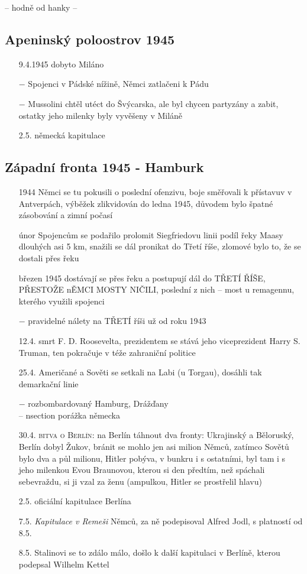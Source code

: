 \documentclass{article}
\begin{document}
-- hodně od hanky --

\subsection*{Apeninský poloostrov 1945}
\begin{itemize}
    \vspace{-0.5em}
    \setlength\itemsep{0.15em}
    \item[9.4.1945] dobyto Miláno
    \item[$-$] Spojenci v Pádské nížině, Němci zatlačeni k Pádu
    \item[$-$] Mussolini chtěl utéct do Švýcarska, ale byl chycen partyzány a zabit, ostatky jeho milenky byly vyvěšeny v Miláně
    \item[2.5.] německá kapitulace
\end{itemize}

\subsection*{Západní fronta 1945 - Hamburk}
\begin{itemize}
    \vspace{-0.5em}
    \setlength\itemsep{0.15em}
    \item[1944] Němci se tu pokusili o poslední ofenzivu, boje směřovali k přístavuv v Antverpách, výběžek zlikvidován do ledna 1945, důvodem bylo špatné zásobování a zimní počasí
    \item[únor] Spojencům se podařilo prolomit Siegfriedovu linii podíl řeky Maasy dlouhých asi 5 km, snažili se dál pronikat do Třetí říše, zlomové bylo to, že se dostali přes řeku
    \item[březen 1945] dostávají se přes řeku a postupují dál do TŘETÍ ŘÍŠE, PŘESTOŽE nĚMCI MOSTY NIČILI, poslední z nich -- most u remagennu, kterého využili spojenci
    \item[$-$] pravidelné nálety na TŘETÍ říši už od roku 1943
    \item[12.4.] smrt F. D. Roosevelta, prezidentem se stává jeho viceprezident Harry S. Truman, ten pokračuje v téže zahraniční politice
    \item[25.4.] Američané a Sověti se setkali na Labi (u Torgau), dosáhli tak demarkační linie
    \item[$-$] rozbombardovaný Hamburg, Drážďany\\
    -- nsection porážka německa
    \item[30.4.] \textsc{bitva o Berlín}: na Berlín táhnout dva fronty: Ukrajinský a Běloruský, Berlín dobyl Žukov, bránit se mohlo jen asi milion Němců, zatímco Sovětů bylo dva a půl milionu, Hitler pobýva, v bunkru i s ostatními, byl tam i s jeho milenkou Evou Braunovou, kterou si den předtím, než spáchali sebevraždu, si ji vzal za ženu (ampulkou, Hitler se prostřelil hlavu)
    \item[2.5.] oficiální kapitulace Berlína
    \item[7.5.] \textit{Kapitulace v Remeši} Němců, za ně podepisoval Alfred Jodl, s platností od 8.5.
    \item[8.5.] Stalinovi se to zdálo málo, došlo k další kapitulaci v Berlíně, kterou podepsal Wilhelm Kettel
\end{itemize}
\end{document}
